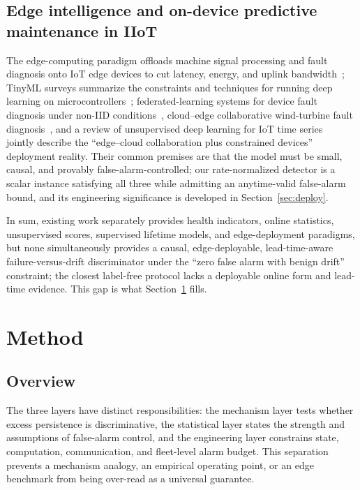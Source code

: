 \documentclass[journal]{IEEEtran}
\begin{document}
\subsection{Edge intelligence and on-device predictive maintenance in IIoT}
The edge-computing paradigm offloads machine signal processing and fault diagnosis onto IoT edge devices to cut latency, energy, and uplink bandwidth~\cite{lu2023edge}; TinyML surveys summarize the constraints and techniques for running deep learning on microcontrollers~\cite{abadade2023tinyml}; federated-learning systems for device fault diagnosis under non-IID conditions~\cite{xiao2024bcefl}, cloud--edge collaborative wind-turbine fault diagnosis~\cite{jiang2024wtfl}, and a review of unsupervised deep learning for IoT time series~\cite{liu2023iot} jointly describe the ``edge--cloud collaboration plus constrained devices'' deployment reality. Their common premises are that the model must be small, causal, and provably false-alarm-controlled; our rate-normalized detector is a scalar instance satisfying all three while admitting an anytime-valid false-alarm bound, and its engineering significance is developed in Section~\ref{sec:deploy}.

In sum, existing work separately provides health indicators, online statistics, unsupervised scores, supervised lifetime models, and edge-deployment paradigms, but none simultaneously provides a causal, edge-deployable, lead-time-aware failure-versus-drift discriminator under the ``zero false alarm with benign drift'' constraint; the closest label-free protocol lacks a deployable online form and lead-time evidence. This gap is what Section~\ref{sec:method} fills.

\section{Method}\label{sec:method}

\subsection{Overview}
The three layers have distinct responsibilities: the mechanism layer tests whether excess persistence is discriminative, the statistical layer states the strength and assumptions of false-alarm control, and the engineering layer constrains state, computation, communication, and fleet-level alarm budget. This separation prevents a mechanism analogy, an empirical operating point, or an edge benchmark from being over-read as a universal guarantee.
\end{document}
